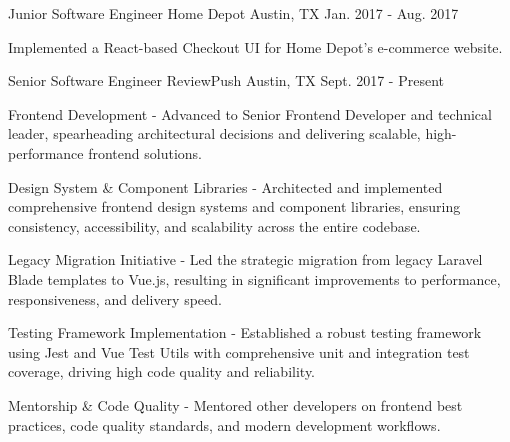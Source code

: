 \begin{cventries}
    \cventry
    {Junior Software Engineer} %
    {Home Depot} %
    {Austin, TX} %
    {Jan. 2017 - Aug. 2017} %
    {
        \vspace{-4mm}
        \begin{cvitems} %
            \item {Implemented a React-based Checkout UI for Home Depot's e-commerce website.}
        \end{cvitems}
    }
    \cventry
    {Senior Software Engineer} %
    {ReviewPush} %
    {Austin, TX} %
    {Sept. 2017 - Present} %
    {
        \vspace{-4mm}
        \begin{cvitems} %
            \item {Frontend Development - Advanced to Senior Frontend Developer and technical leader, spearheading architectural decisions and delivering scalable, high-performance frontend solutions.}
        \end{cvitems}
        \begin{cvsubitems}
            \item {Design System \& Component Libraries - Architected and implemented comprehensive frontend design systems and component libraries, ensuring consistency, accessibility, and scalability across the entire codebase.}
            \item {Legacy Migration Initiative - Led the strategic migration from legacy Laravel Blade templates to Vue.js, resulting in significant improvements to performance, responsiveness, and delivery speed.}
            \item {Testing Framework Implementation - Established a robust testing framework using Jest and Vue Test Utils with comprehensive unit and integration test coverage, driving high code quality and reliability.}
            \item {Mentorship \& Code Quality - Mentored other developers on frontend best practices, code quality standards, and modern development workflows.}

\end{cvsubitems}}
\end{cventries}
